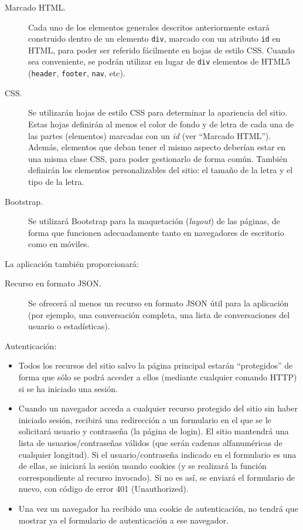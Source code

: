 \begin{description}
\item[Marcado HTML.] Cada uno de los elementos generales descritos anteriormente estará construido dentro de un elemento \texttt{div}, marcado con un atributo \texttt{id} en HTML, para poder ser referido fácilmente en hojas de estilo CSS. Cuando sea conveniente, se podrán utilizar en lugar de \texttt{div} elementos de HTML5 (\texttt{header}, \texttt{footer}, \texttt{nav}, etc).

\item[CSS.] Se utilizarán hojas de estilo CSS para determinar la apariencia del sitio. Estas hojas definirán al menos el color de fondo y de letra de cada una de las partes (elementos) marcadas con un \emph{id} (ver ``Marcado HTML''). Además, elementos que deban tener el mismo aspecto deberían estar en una misma clase CSS, para poder gestionarlo de forma común. También definirán los elementos personalizables del sitio: el tamaño de la letra y el tipo de la letra.

\item[Bootstrap.] Se utilizará Bootstrap para la maquetación (\emph{layout}) de las páginas, de forma que funcionen adecuadamente tanto en navegadores de escritorio como en móviles.
\end{description}

La aplicación también proporcionará:

\begin{description}
\item[Recurso en formato JSON.] Se ofrecerá al menos un recurso en formato JSON útil para la aplicación (por ejemplo, una conversación completa, una lista de conversaciones del usuario o estadísticas).
\end{description}


Autenticación:

\begin{itemize}
\item Todos los recursos del sitio salvo la página principal estarán ``protegidos'' de forma que sólo se podrá acceder a ellos (mediante cualquier comando HTTP) si se ha iniciado una sesión.
  
\item Cuando un navegador acceda a cualquier recurso protegido del sitio sin haber iniciado sesión, recibirá una redirección a un formulario en el que se le solicitará usuario y contraseña (la página de login). El sitio mantendrá una lista de usuarios/contraseñas válidos (que serán cadenas alfanuméricas de cualquier longitud). Si el usuario/contraseña indicado en el formulario es una de ellas, se iniciará la sesión usando cookies (y se realizará la función correspondiente al recurso invocado). Si no es así, se enviará el formulario de nuevo, con código de error 401 (Unauthorized).

\item Una vez un navegador ha recibido una cookie de autenticación, no tendrá que mostrar ya el formulario de autenticación a ese navegador.
  
\end{itemize}


